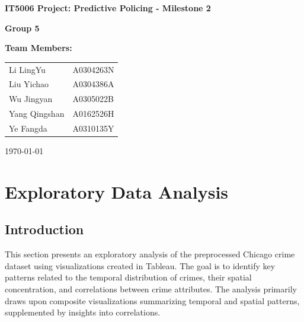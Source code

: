\documentclass[11pt]{article}
\begin{document}
\begin{titlepage}
  \centering
  
  \vspace*{3cm}
  
  {\LARGE \textbf{IT5006 Project: Predictive Policing - Milestone 2}}
  
  \vspace{2cm}
  
  {\Large \textbf{Group 5}}
  
  \vspace{2cm}
  
  {\Large \textbf{Team Members:}}
  
  \vspace{1cm}
  
  \begin{tabular}{ll}
    Li LingYu & A0304263N \\
    Liu Yichao & A0304386A \\
    Wu Jingyan & A0305022B \\
    Yang Qingshan & A0162526H \\
    Ye Fangda & A0310135Y
  \end{tabular}
  
  \vspace{2cm}
  
  
  \vspace{1cm}
  
  {\Large \today}
  
\end{titlepage}

\newpage

\makeatother


\section{Exploratory Data Analysis}
\label{sec:eda}

\subsection{Introduction}
\label{subsec:eda_intro}
This section presents an exploratory analysis of the preprocessed Chicago crime dataset using visualizations created in Tableau. The goal is to identify key patterns related to the temporal distribution of crimes, their spatial concentration, and correlations between crime attributes. The analysis primarily draws upon composite visualizations summarizing temporal and spatial patterns, supplemented by insights into correlations.
\end{document}
